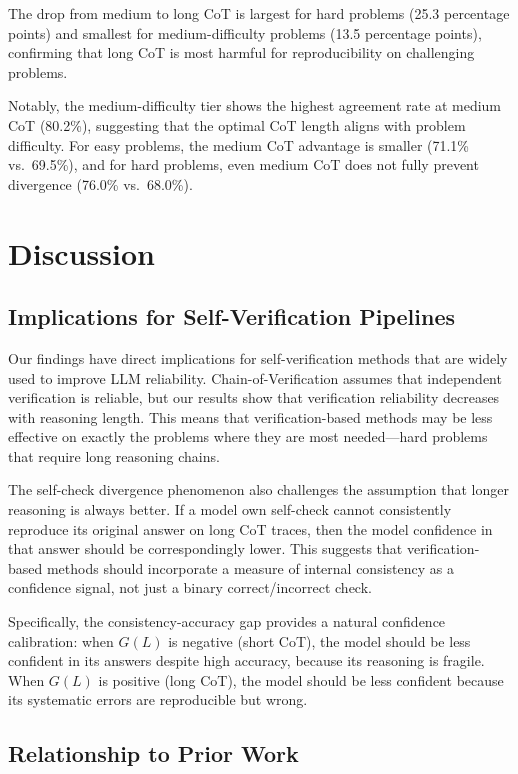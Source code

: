 \documentclass[11pt,letterpaper]{article}
\begin{document}
The drop from medium to long CoT is largest for hard problems (25.3 percentage points) and smallest for medium-difficulty problems (13.5 percentage points), confirming that long CoT is most harmful for reproducibility on challenging problems.

Notably, the medium-difficulty tier shows the highest agreement rate at medium CoT (80.2\%), suggesting that the optimal CoT length aligns with problem difficulty. For easy problems, the medium CoT advantage is smaller (71.1\% vs.\ 69.5\%), and for hard problems, even medium CoT does not fully prevent divergence (76.0\% vs.\ 68.0\%).

\section{Discussion}

\subsection{Implications for Self-Verification Pipelines}

Our findings have direct implications for self-verification methods that are widely used to improve LLM reliability. Chain-of-Verification \citep{Dhuliawala2023} assumes that independent verification is reliable, but our results show that verification reliability decreases with reasoning length. This means that verification-based methods may be less effective on exactly the problems where they are most needed---hard problems that require long reasoning chains.

The self-check divergence phenomenon also challenges the assumption that longer reasoning is always better. If a model own self-check cannot consistently reproduce its original answer on long CoT traces, then the model confidence in that answer should be correspondingly lower. This suggests that verification-based methods should incorporate a measure of internal consistency as a confidence signal, not just a binary correct/incorrect check.

Specifically, the consistency-accuracy gap provides a natural confidence calibration: when $G(L)$ is negative (short CoT), the model should be less confident in its answers despite high accuracy, because its reasoning is fragile. When $G(L)$ is positive (long CoT), the model should be less confident because its systematic errors are reproducible but wrong.

\subsection{Relationship to Prior Work}
\end{document}
